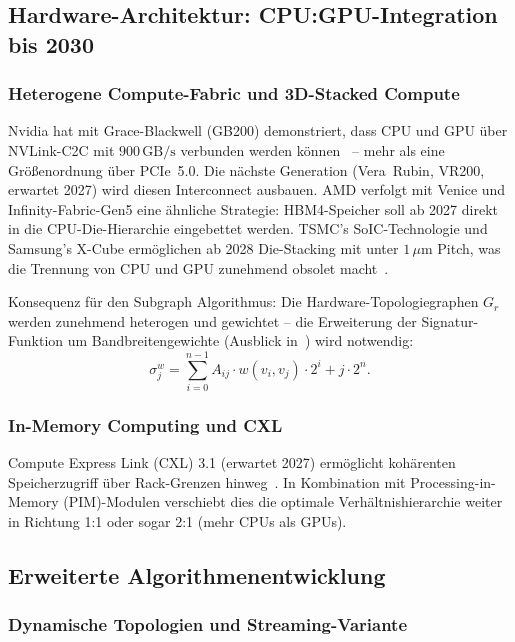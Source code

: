 ﻿\documentclass[a4paper,12pt]{article}
\theoremstyle{definition}
\begin{document}
\subsection{Hardware-Architektur: CPU:GPU-Integration bis 2030}

\subsubsection{Heterogene Compute-Fabric und 3D-Stacked Compute}

Nvidia hat mit Grace-Blackwell (GB200) demonstriert, dass CPU und GPU \"{u}ber NVLink-C2C mit $900\,\text{GB/s}$ verbunden werden k\"{o}nnen~\cite{nvidia2024gb200} -- mehr als eine Gr\"{o}{\ss}enordnung \"{u}ber PCIe~5.0. Die n\"{a}chste Generation (Vera~Rubin, VR200, erwartet 2027) wird diesen Interconnect ausbauen.
AMD verfolgt mit Venice und Infinity-Fabric-Gen5 eine \"{a}hnliche Strategie: HBM4-Speicher soll ab 2027 direkt in die CPU-Die-Hierarchie eingebettet werden.
TSMC's SoIC-Technologie und Samsung's X-Cube erm\"{o}glichen ab 2028 Die-Stacking mit unter $1\,\mu\text{m}$ Pitch, was die Trennung von CPU und GPU zunehmend obsolet macht~\cite{tsmc2025soic}.

Konsequenz f\"{u}r den Subgraph Algorithmus: Die Hardware-Topologiegraphen $G_r$ werden zunehmend heterogen und gewichtet -- die Erweiterung der Signatur-Funktion um Bandbreitengewichte (Ausblick in~\cite{epp2026subgraph}) wird notwendig:
\[
  \sigma_j^w = \sum_{i=0}^{n-1} A_{ij} \cdot w(v_i, v_j) \cdot 2^i + j \cdot 2^n.
\]

\subsubsection{In-Memory Computing und CXL}

Compute Express Link (CXL) 3.1 (erwartet 2027) erm\"{o}glicht koh\"{a}renten Speicherzugriff \"{u}ber Rack-Grenzen hinweg~\cite{cxl2024spec}.
In Kombination mit Processing-in-Memory (PIM)-Modulen verschiebt dies die optimale Verh\"{a}ltnishierarchie weiter in Richtung 1:1 oder sogar 2:1 (mehr CPUs als GPUs).

\subsection{Erweiterte Algorithmenentwicklung}

\subsubsection{Dynamische Topologien und Streaming-Variante}
\end{document}
